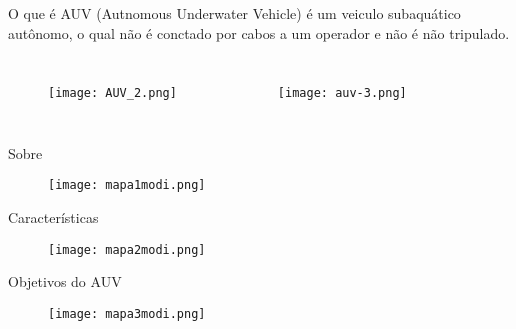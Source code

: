 \begin{frame}[t]{O que é} 
    \transdissolve[duration=0.5]
    AUV (Autnomous Underwater Vehicle) é um veiculo subaquático autônomo, o qual não é conctado por cabos 
    a um operador e não é não tripulado.

    \begin{columns}[t]
        
        \begin{figure}
            \texttt{[image: AUV\_2.png]}%
            \caption{\nocite{REMUS6001:online}}
        \end{figure}
        
        \begin{figure}
           \texttt{[image: auv-3.png]}%
            \caption{\nocite{BlueROV210:online}}
        \end{figure}
        
    \end{columns}

\end{frame}
\begin{frame}[c]{Sobre }
        \begin{figure}
        \texttt{[image: mapa1modi.png]}
    \end{figure}
\end{frame}
\begin{frame}[c]{Características }
        \begin{figure}
        \texttt{[image: mapa2modi.png]}
    \end{figure}
\end{frame}
\begin{frame}[c]{Objetivos do AUV}
        \begin{figure}
        \texttt{[image: mapa3modi.png]}
    \end{figure}
\end{frame}

